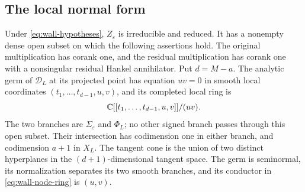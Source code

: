 

\subsection{The local normal form}
\begin{theorem}\label{thm:wall-node}
Under \eqref{eq:wall-hypotheses}, $Z_\varepsilon$ is irreducible and
reduced. It has a nonempty dense open subset on which the following
assertions hold. The original multiplication has corank one, and the
residual multiplication has corank one with a nonsingular residual
Hankel annihilator. Put $d=M-a$. The analytic germ of $\mathscr D_L$ at its projected point has
equation $uv=0$ in smooth local coordinates
$(t_1,\ldots,t_{d-1},u,v)$, and its completed local ring is
\begin{equation}\label{eq:wall-node-ring}
 \mathbb C[[t_1,\ldots,t_{d-1},u,v]]/(uv).
\end{equation}
The two branches are $\Sigma_\varepsilon$ and $\Phi_L$; no other
signed branch passes through this open subset. Their intersection has
codimension one in either branch, and codimension $a+1$ in $X_L$.
The tangent cone is the union of two distinct hyperplanes in the
$(d+1)$-dimensional tangent space. The germ is seminormal, its
normalization separates its two smooth branches, and its conductor in
\eqref{eq:wall-node-ring} is $(u,v)$.
\end{theorem}
